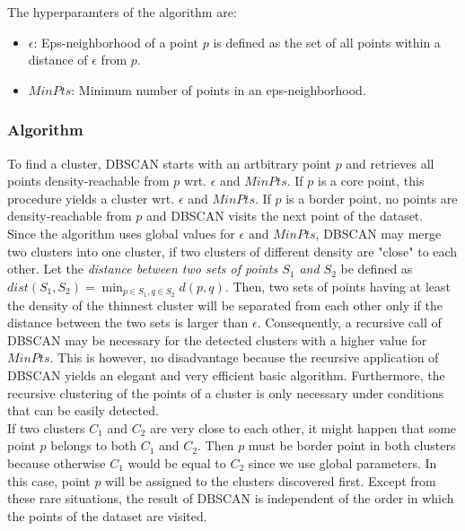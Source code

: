 \documentclass[conference]{IEEEtran}
\begin{document}
The hyperparamters of the algorithm are:
\begin{itemize}
    \item \( \epsilon \): Eps-neighborhood of a point \( p \) is defined as the set of all points within a distance of \( \epsilon \) from \( p \).
    \item \( MinPts \): Minimum number of points in an eps-neighborhood.
\end{itemize}

\subsubsection{Algorithm}
To find a cluster, DBSCAN starts with an artbitrary point \( p \) and retrieves all points density-reachable from \( p \) wrt. \( \epsilon \) and \( MinPts \). If \( p \) is a core point, this procedure yields a cluster wrt. \( \epsilon \) and \( MinPts \). If \( p \) is a border point, no points are density-reachable from \( p \) and DBSCAN visits the next point of the dataset. \\

Since the algorithm uses global values for \( \epsilon \) and \( MinPts \),  DBSCAN may merge two clusters into one cluster, if two clusters of different density are "close" to each other. Let the \textit{distance between two sets of points \( S_1 \) and \( S_2 \)} be defined as \( dist(S_1, S_2) = \min_{p \in S_1, q \in S_2} d(p, q) \). Then, two sets of points having at least the density of the thinnest cluster will be separated from each other only if the distance between the two sets is larger than \( \epsilon \). Consequently, a recursive call of DBSCAN may be necessary for the detected clusters with a higher value for \( MinPts \). This is however, no disadvantage because the recursive application of DBSCAN yields an elegant and very efficient basic algorithm. Furthermore, the recursive clustering of the points of a cluster is only necessary under conditions that can be easily detected. \\

If two clusters \( C_1 \) and \( C_2 \) are very close to each other, it might happen that some point \( p \) belongs to both \( C_1 \) and \( C_2 \). Then \( p \) must be border point in both clusters because otherwise \( C_1 \) would be equal to \( C_2 \) since we use global parameters. In this case, point \( p \) will be assigned to the clusters discovered first. Except from these rare situations, the result of DBSCAN is independent of the order in which the points of the dataset are visited. \\
\end{document}
